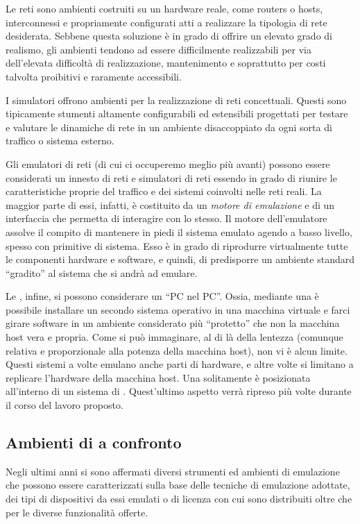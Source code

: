 Le reti \testbed{} sono ambienti costruiti su un hardware reale, come routers o hosts, interconnessi e propriamente configurati atti a realizzare la tipologia di rete desiderata. Sebbene questa soluzione è in grado di offrire un elevato grado di realismo, gli ambienti \testbed{} tendono ad essere difficilmente realizzabili per via dell'elevata difficoltà di realizzazione, mantenimento e soprattutto per costi talvolta proibitivi e raramente accessibili.

I simulatori offrono ambienti per la realizzazione di reti concettuali. Questi sono tipicamente stumenti altamente configurabili ed estensibili progettati per testare e valutare le dinamiche di rete in un ambiente disaccoppiato da ogni sorta di traffico o sistema esterno. 

Gli emulatori di reti (di cui ci occuperemo meglio più avanti) possono essere considerati un innesto di reti \testbed{} e simulatori di reti essendo in grado di riunire le caratteristiche proprie del traffico e dei sistemi coinvolti nelle reti reali. La maggior parte di essi, infatti, è costituito da un \emph{motore di emulazione} e di un interfaccia che permetta di interagire con lo stesso. Il motore dell'emulatore assolve il compito di mantenere in piedi il sistema emulato agendo a basso livello, spesso con primitive di sistema. Esso è in grado di riprodurre virtualmente tutte le componenti hardware e software, e quindi, di predisporre un ambiente standard ``gradito'' al sistema che si andrà ad emulare.

Le \virtualmachine{}, infine, si possono considerare un ``PC nel PC''. Ossia, mediante una \virtualmachine{} è possibile installare un secondo sistema operativo in una macchina virtuale e farci girare software in un ambiente considerato più ``protetto'' che non la macchina host vera e propria. Come si può immaginare, al di là della lentezza (comunque relativa e proporzionale alla potenza della macchina host), non vi è alcun limite. Questi sistemi a volte emulano anche parti di hardware, e altre volte si limitano a replicare l'hardware della macchina host. Una \virtualmachine{} solitamente è posizionata all'interno di un sistema di \emulazione{}. Quest'ultimo aspetto verrà ripreso più volte durante il corso del lavoro proposto.


\subsection{Ambienti di \emulazione{} a confronto}
Negli ultimi anni si sono affermati diversi strumenti ed ambienti di emulazione che possono essere caratterizzati sulla base delle tecniche di emulazione adottate, dei tipi di dispositivi da essi emulati o di licenza con cui sono distribuiti oltre che per le diverse funzionalità offerte.


